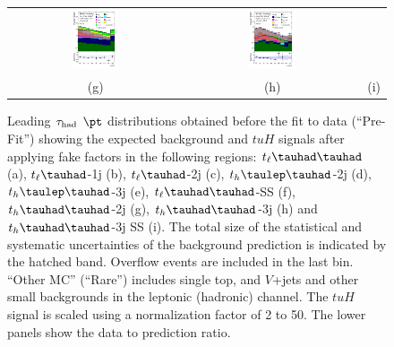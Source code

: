 \begin{figure}[H]
\begin{tabular}{@{}ccc@{}}
\includegraphics[page=1,width=0.28\textwidth]{figures/new_pt/log_or_nolog/tuH_reg2mtau1b3jos_log_.pdf}&
\includegraphics[page=1,width=0.28\textwidth]{figures/new_pt/log_or_nolog/tuH_reg2mtau1b3jss_log_.pdf}\\
(g) & (h) & (i)\\
\end{tabular}
\caption{Leading $\tau_\text{had}$ $\pt$  distributions obtained before the fit to data (``Pre-Fit'') showing 
  the expected background and $tuH$ signals after applying fake factors in the following regions: $t_{\ell}\thadhad$ (a),
 $t_{\ell}\tauhad$-1j (b),  $t_{\ell}\tauhad$-2j (c), $t_h\tlhad$-2j (d), $t_h\tlhad$-3j (e), $t_{\ell}\thadhad$-SS  (f), $t_h\thadhad$-2j (g), $t_h\thadhad$-3j (h) and $t_h\thadhad$-3j SS (i).
 The total size of the statistical and systematic uncertainties of the background prediction is indicated by the hatched band.
 Overflow events are included in the last bin. ``Other MC'' (``Rare'') includes single top, and $V$+jets and other small backgrounds in the leptonic (hadronic) channel. The $tuH$ signal is scaled using a normalization factor of 2 to 50.   
The lower panels show the data to prediction ratio.}
\label{fig:taupt_prefit}
\end{figure}




